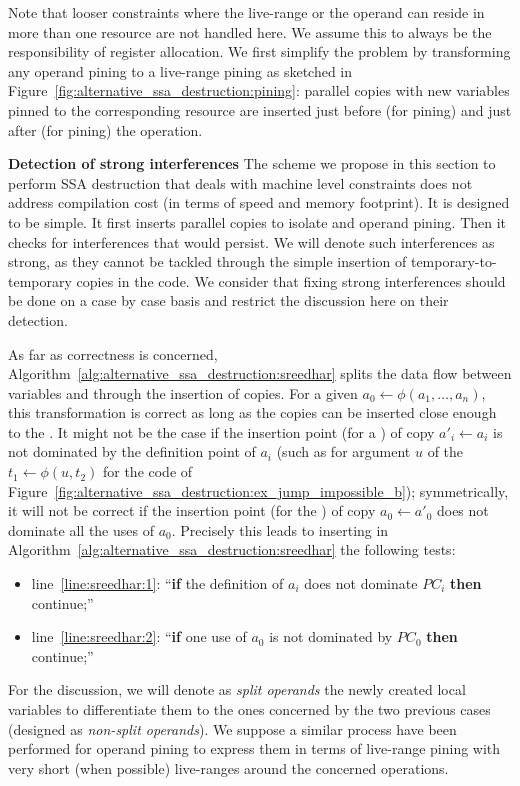 Note that looser constraints where the live-range or the operand can reside in more than one resource are not handled here. We assume this to always be the responsibility of register allocation.
We first simplify the problem by transforming any operand pining to a live-range pining as sketched in Figure~\ref{fig:alternative_ssa_destruction:pining}: parallel copies with new variables pinned to the corresponding resource are inserted just before (for \useop pining) and just after (for  pining) the operation.




{\bf Detection of strong interferences}
\label{par:alternative_ssa_destruction:strong}
The scheme we propose in this section to perform SSA destruction that deals with machine level constraints does not address compilation cost (in terms of speed and memory footprint). It is designed to be simple. It first inserts parallel copies to isolate \phifuns and operand pining. Then it checks for interferences that would persist. We will denote such interferences as strong, as they cannot be tackled through the simple insertion of temporary-to-temporary copies in the code. We consider that fixing strong interferences should be done on a case by case basis and restrict the discussion here on their detection.

As far as correctness is concerned, Algorithm~\ref{alg:alternative_ssa_destruction:sreedhar} splits the data flow between variables and \phinodes through the insertion of copies. For a given \phifun $a_0\gets \phi(a_1,\dots,a_n)$, this transformation is correct as long as the copies can be inserted close enough to the \phifun. It might not be the case if the insertion point (for a \useop) of copy $a'_i\gets a_i$ is not dominated by the definition point of $a_i$ (such as for argument $u$ of the \phifun $t_1\gets \phi(u,t_2)$ for the code of Figure~\ref{fig:alternative_ssa_destruction:ex_jump_impossible_b}); symmetrically, it will not be correct if the insertion point (for the ) of copy $a_0\gets a'_0$ does not dominate all the uses of $a_0$. Precisely this leads to inserting in Algorithm~\ref{alg:alternative_ssa_destruction:sreedhar} the following tests:
\begin{itemize}
\item line~\ref{line:sreedhar:1}: ``{\bf if} the definition of $a_i$ does not dominate $PC_i$ {\bf then} continue;''
\item line~\ref{line:sreedhar:2}: ``{\bf if} one use of $a_0$ is not dominated by $PC_0$ {\bf then} continue;''
\end{itemize}
For the discussion, we will denote as \emph{split operands} the newly created local variables to differentiate them to the ones concerned by the two previous cases (designed as \emph{non-split operands}).
% 
We suppose a similar process have been performed for operand pining to express them in terms of live-range pining with very short (when possible) live-ranges around the concerned operations. 

